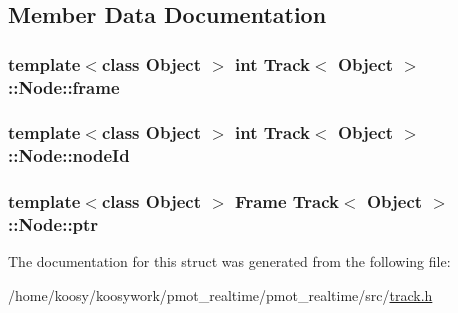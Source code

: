 \subsection{\-Member \-Data \-Documentation}
\hypertarget{struct_track_1_1_node_ac7729bceaed8d441bfcf81162936e5be}{
\subsubsection[{frame}]{\setlength{\rightskip}{0pt plus 5cm}template$<$class Object $>$ int {\bf \-Track}$<$ \-Object $>$\-::{\bf \-Node\-::frame}}}\label{struct_track_1_1_node_ac7729bceaed8d441bfcf81162936e5be}
\hypertarget{struct_track_1_1_node_aa86e28e758e2a6833d09d8653488a553}{
\subsubsection[{node\-Id}]{\setlength{\rightskip}{0pt plus 5cm}template$<$class Object $>$ int {\bf \-Track}$<$ \-Object $>$\-::{\bf \-Node\-::node\-Id}}}\label{struct_track_1_1_node_aa86e28e758e2a6833d09d8653488a553}
\hypertarget{struct_track_1_1_node_ab2ede054f99dfa482e000894cdc35740}{
\subsubsection[{ptr}]{\setlength{\rightskip}{0pt plus 5cm}template$<$class Object $>$ {\bf \-Frame} {\bf \-Track}$<$ \-Object $>$\-::{\bf \-Node\-::ptr}}}\label{struct_track_1_1_node_ab2ede054f99dfa482e000894cdc35740}


\-The documentation for this struct was generated from the following file\-:\begin{DoxyCompactItemize}
\item 
/home/koosy/koosywork/pmot\-\_\-realtime/pmot\-\_\-realtime/src/\hyperlink{track_8h}{track.\-h}\end{DoxyCompactItemize}
